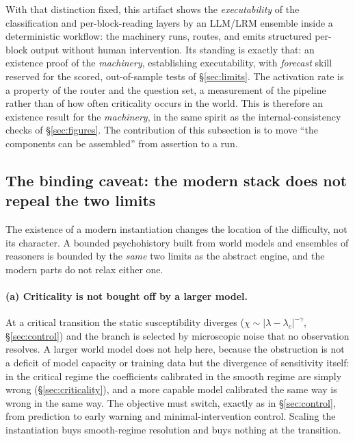 \documentclass[11pt]{article}
\begin{document}
With that distinction fixed, this artifact shows the \emph{executability} of the classification and per-block-reading layers by an LLM/LRM ensemble inside a deterministic workflow: the machinery runs, routes, and emits structured per-block output without human intervention. Its standing is exactly that: an existence proof of the \emph{machinery}, establishing executability, with \emph{forecast} skill reserved for the scored, out-of-sample tests of \S\ref{sec:limits}. The activation rate is a property of the router and the question set, a measurement of the pipeline rather than of how often criticality occurs in the world. This is therefore an existence result for the \emph{machinery}, in the same spirit as the internal-consistency checks of \S\ref{sec:figures}. The contribution of this subsection is to move ``the components can be assembled'' from assertion to a run.

\subsection{The binding caveat: the modern stack does not repeal the two limits}

The existence of a modern instantiation changes the location of the difficulty, not its character. A bounded psychohistory built from world models and ensembles of reasoners is bounded by the \emph{same} two limits as the abstract engine, and the modern parts do not relax either one.

\paragraph{(a) Criticality is not bought off by a larger model.} At a critical transition the static susceptibility diverges ($\chi \sim |\lambda-\lambda_c|^{-\gamma}$, \S\ref{sec:control}) and the branch is selected by microscopic noise that no observation resolves. A larger world model does not help here, because the obstruction is not a deficit of model capacity or training data but the divergence of sensitivity itself: in the critical regime the coefficients calibrated in the smooth regime are simply wrong (\S\ref{sec:criticality}), and a more capable model calibrated the same way is wrong in the same way. The objective must switch, exactly as in \S\ref{sec:control}, from prediction to early warning and minimal-intervention control. Scaling the instantiation buys smooth-regime resolution and buys nothing at the transition.
\end{document}
